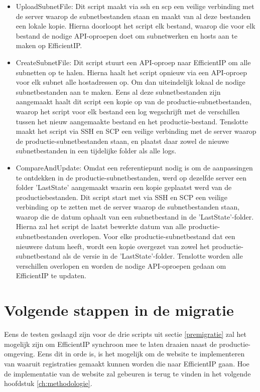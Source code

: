 \begin{itemize}
    \item UploadSubnetFile: Dit script maakt via \acrshort{ssh} en \acrshort{scp} een veilige verbinding met de server waarop de subnetbestanden staan en maakt van al deze bestanden een lokale kopie. Hierna doorloopt het script elk bestand, waarop die voor elk bestand de nodige API-oproepen doet om subnetwerken en hosts aan te maken op EfficientIP.
    \item CreateSubnetFile: Dit script stuurt een API-oproep naar EfficientIP om alle subnetten op te halen. Hierna haalt het script opnieuw via een API-oproep voor elk subnet alle hostadressen op. Om dan uiteindelijk lokaal de nodige subnetbestanden aan te maken. Eens al deze subnetbestanden zijn aangemaakt haalt dit script een kopie op van de productie-subnetbestanden, waarop het script voor elk bestand een log wegschrijft met de verschillen tussen het nieuw aangemaakte bestand en het productie-bestand. Tenslotte maakt het script via SSH en SCP een veilige verbinding met de server waarop de productie-subnetbestanden staan, en plaatst daar zowel de nieuwe subnetbestanden in een tijdelijke folder als alle logs.
    \item CompareAndUpdate: Omdat een referentiepunt nodig is om de aanpassingen te ontdekken in de productie-subnetbestanden, werd op dezelfde server een folder 'LastState' aangemaakt waarin een kopie geplaatst werd van de productiebestanden. Dit script start met via SSH en SCP een veilige verbinding op te zetten met de server waarop de subnetbestanden staan, waarop die de datum ophaalt van een subnetbestand in de 'LastState'-folder. Hierna zal het script de laatst bewerkte datum van alle productie-subnetbestanden overlopen. Voor elke productie-subnetbestand dat een nieuwere datum heeft, wordt een kopie overgezet van zowel het productie-subnetbestand als de versie in de 'LastState'-folder. Tenslotte worden alle verschillen overlopen en worden de nodige API-oproepen gedaan om EfficientIP te updaten.
\end{itemize}


\section{Volgende stappen in de migratie}
Eens de testen geslaagd zijn voor de drie scripts uit sectie \ref{premigratie} zal het mogelijk zijn om EfficientIP synchroon mee te laten draaien naast de productie-omgeving. Eens dit in orde is, is het mogelijk om de website te implementeren van waaruit registraties gemaakt kunnen worden die naar EfficientIP gaan. Hoe de implementatie van de website zal gebeuren is terug te vinden in het volgende hoofdstuk \ref{ch:methodologie}.


